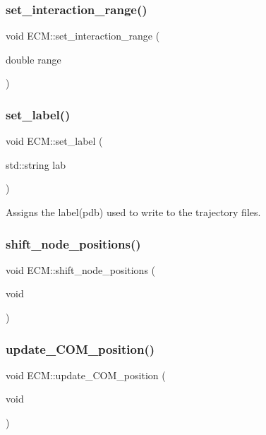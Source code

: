 \subsubsection{\texorpdfstring{set\_interaction\_range()}{set\_interaction\_range()}}
{\footnotesize\ttfamily void E\+C\+M\+::set\+\_\+interaction\+\_\+range (\begin{DoxyParamCaption}\item[{double}]{range }\end{DoxyParamCaption})\hspace{0.3cm}{\ttfamily [inline]}}

\mbox{\label{classECM_aa2f9122b1b849ab31856464889d328f4}} 
\subsubsection{\texorpdfstring{set\_label()}{set\_label()}}
{\footnotesize\ttfamily void E\+C\+M\+::set\+\_\+label (\begin{DoxyParamCaption}\item[{std\+::string}]{lab }\end{DoxyParamCaption})\hspace{0.3cm}{\ttfamily [inline]}}

Assigns the label(pdb) used to write to the trajectory files. \mbox{\label{classECM_a27b1c92c5a5d332698d7ae7cad1c36e4}} 
\subsubsection{\texorpdfstring{shift\_node\_positions()}{shift\_node\_positions()}}
{\footnotesize\ttfamily void E\+C\+M\+::shift\+\_\+node\+\_\+positions (\begin{DoxyParamCaption}\item[{void}]{ }\end{DoxyParamCaption})\hspace{0.3cm}{\ttfamily [inline]}}

\mbox{\label{classECM_a492d0690a480a0f0fdfcef3ef35bc970}} 
\subsubsection{\texorpdfstring{update\_COM\_position()}{update\_COM\_position()}}
{\footnotesize\ttfamily void E\+C\+M\+::update\+\_\+\+C\+O\+M\+\_\+position (\begin{DoxyParamCaption}\item[{void}]{ }\end{DoxyParamCaption})\hspace{0.3cm}{\ttfamily [inline]}}

